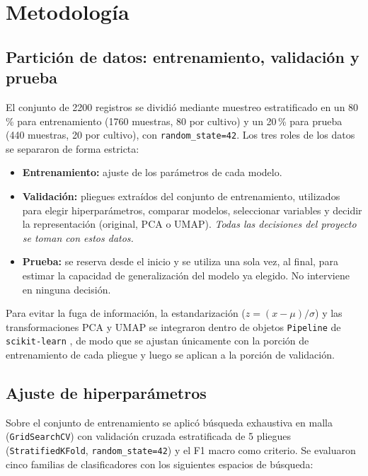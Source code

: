 \documentclass[conference]{IEEEtran}
\begin{document}
\section{Metodología}
\label{sec:metodologia}

\subsection{Partición de datos: entrenamiento, validación y prueba}

El conjunto de 2200 registros se dividió mediante muestreo estratificado en un 80\,\% para entrenamiento (1760 muestras, 80 por cultivo) y un 20\,\% para prueba (440 muestras, 20 por cultivo), con \texttt{random\_state=42}. Los tres roles de los datos se separaron de forma estricta:
\begin{itemize}
    \item \textbf{Entrenamiento:} ajuste de los parámetros de cada modelo.
    \item \textbf{Validación:} pliegues extraídos del conjunto de entrenamiento, utilizados para elegir hiperparámetros, comparar modelos, seleccionar variables y decidir la representación (original, PCA o UMAP). \emph{Todas las decisiones del proyecto se toman con estos datos.}
    \item \textbf{Prueba:} se reserva desde el inicio y se utiliza una sola vez, al final, para estimar la capacidad de generalización del modelo ya elegido. No interviene en ninguna decisión.
\end{itemize}

Para evitar la fuga de información, la estandarización ($z=(x-\mu)/\sigma$) y las transformaciones PCA y UMAP se integraron dentro de objetos \texttt{Pipeline} de \texttt{scikit-learn} \cite{pedregosa2011}, de modo que se ajustan únicamente con la porción de entrenamiento de cada pliegue y luego se aplican a la porción de validación.

\subsection{Ajuste de hiperparámetros}

Sobre el conjunto de entrenamiento se aplicó búsqueda exhaustiva en malla (\texttt{GridSearchCV}) con validación cruzada estratificada de 5 pliegues (\texttt{StratifiedKFold}, \texttt{random\_state=42}) y el F1 macro como criterio. Se evaluaron cinco familias de clasificadores con los siguientes espacios de búsqueda:
\end{document}
